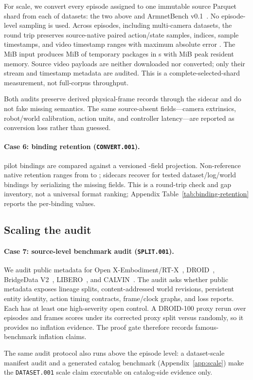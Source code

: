 For scale, we convert every episode assigned to one immutable source Parquet shard from each of
\ExpConversionScaleDatasetCount{} datasets: the two above and ArmnetBench
v0.1~\citep{armnetbench_lerobot_so101}. No episode-level sampling is used. Across
\ExpConversionScaleEpisodeCount{} episodes, including \ExpConversionScaleMultiCameraDatasetCount{}
multi-camera datasets, the round trip preserves \ExpConversionScaleRowCount{} source-native paired
action/state samples, indices, sample timestamps, and video timestamp ranges with maximum absolute
error \ExpConversionScaleMaxError{}. The \ExpConversionScaleSourceInputMiB{} MiB input produces
\ExpConversionScaleTemporaryOutputMiB{} MiB of temporary packages in
\ExpConversionScaleWallSeconds{} s with \ExpConversionScalePeakMemoryMiB{} MiB peak resident memory.
Source video payloads are neither downloaded nor converted; only their stream and timestamp metadata
are audited. This is a complete-selected-shard measurement, not full-corpus throughput.

Both audits preserve derived physical-frame records through the sidecar and do not fake missing
semantics. The same \ExpConversionScaleSemanticLossFieldCount{} source-absent fields---camera
extrinsics, robot/world calibration, action units, and controller latency---are reported as
conversion loss rather than guessed.

\paragraph{Case 6: binding retention (\texttt{CONVERT.001}).}
\ExpBindingCount{} pilot bindings are compared against a versioned \ExpBindingFieldCount-field
projection. Non-reference native retention ranges from \ExpBindingNativeMin{} to
\ExpBindingNativeMax{}; sidecars recover \ExpBindingLerobotSidecar{} for tested dataset/log/world
bindings by serializing the missing fields. This is a round-trip check and gap inventory, not a
universal format ranking; Appendix Table~\ref{tab:binding-retention} reports the per-binding values.

\subsection{Scaling the audit}

\paragraph{Case 7: source-level benchmark audit (\texttt{SPLIT.001}).}
We audit public metadata for Open
X-Embodiment/RT-X~\citep{openx}, DROID~\citep{droid}, BridgeData V2~\citep{bridgedata},
LIBERO~\citep{libero}, and CALVIN~\citep{calvin}. The audit asks whether public metadata exposes
lineage splits, content-addressed world revisions, persistent entity identity, action timing
contracts, frame/clock graphs, and loss reports. Each has at least one high-severity open control.
A DROID-100 proxy rerun over \ExpDroidRerunEpisodes{} episodes and \ExpDroidRerunFrames{} frames
scores \ExpDroidCorrectedScore{} under its corrected proxy split versus \ExpDroidRandomScore{}
randomly, so it provides no inflation evidence. The proof gate therefore records
\ExpBenchmarkInflationClaimCount{} famous-benchmark inflation claims.

The same audit protocol also runs above the episode level: a dataset-scale manifest audit and a
generated catalog benchmark (Appendix~\ref{app:scale}) make the \texttt{DATASET.001} scale claim
executable on catalog-side evidence only.
\FloatBarrier
